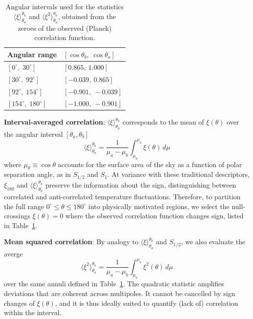 \documentclass[apj,twocolumn,numberedappendix]{openjournal}
\begin{document}
\begin{table}
	\centering
	\caption{Angular intervals used for the statistics $\langle\xi\rangle_{\theta_a}^{\theta_b}$ and $\langle\xi^2\rangle_{\theta_a}^{\theta_b}$, obtained from the zeroes of the observed (Planck) correlation function.}
	\label{tbl-intervals}
	\begin{tabular}{ll}
		\toprule
		Angular range & $[\cos\theta_b,\;\cos\theta_a]$ \\
		\midrule
		$[0^\circ,\;30^\circ]$    & $[0.865,\ 1.000]$  \\
		$[30^\circ,\;92^\circ]$   & $[-0.039,\ 0.865]$ \\
		$[92^\circ,\;154^\circ]$  & $[-0.901,\ -0.039]$\\
		$[154^\circ,\;180^\circ]$ & $[-1.000,\ -0.901]$\\
		\bottomrule
	\end{tabular}
\end{table}

\textbf{Interval-averaged correlation}:
$\langle\xi\rangle_{\theta_a}^{\theta_b}$ corresponds to the mean of $\xi(\theta)$ over the angular interval $[\theta_a, \theta_b]$
\begin{equation}\label{eq-xiv}
\langle\xi\rangle_{\theta_a}^{\theta_b} = \frac{1}{\mu_a-\mu_b}\int_{\mu_b}^{\mu_a} \xi(\theta)\,d\mu 
\end{equation}
where $\mu_\theta \equiv \cos\theta$ accounts for the surface area of the sky as a function of polar separation angle, as in $S_{1/2}$ and $S_1$.
At variance with these traditional descriptors, $\xi_{180}$ and $\langle\xi\rangle_{\theta_a}^{\theta_b}$ preserve the information about the sign, distinguishing between correlated and anti-correlated temperature fluctuations.
Therefore, to partition the full range $0^\circ \le \theta \le 180^\circ$ into physically motivated regions, we select the null-crossings $\xi(\theta) = 0$ where the observed correlation function \citep{cosmoplanck_2020} changes sign, listed in Table~\ref{tbl-intervals}.

\textbf{Mean squared correlation}:
By analogy to $\langle\xi\rangle_{\theta_a}^{\theta_b}$ and $S_{1/2}$, we also evaluate the averge
\begin{equation}\label{eq-xi2}
\langle\xi^2\rangle_{\theta_a}^{\theta_b} = \frac{1}{\mu_a-\mu_b}\int_{\mu_b}^{\mu_a} \xi^2(\theta)\,d\mu 
\end{equation}
over the same annuli defined in Table~\ref{tbl-intervals}.
The quadratic statistic amplifies deviations that are coherent across multipoles.
It cannot be cancelled by sign changes of $\xi(\theta)$, and it is thus ideally suited to quantify (lack of) correlation within the interval.
\end{document}
